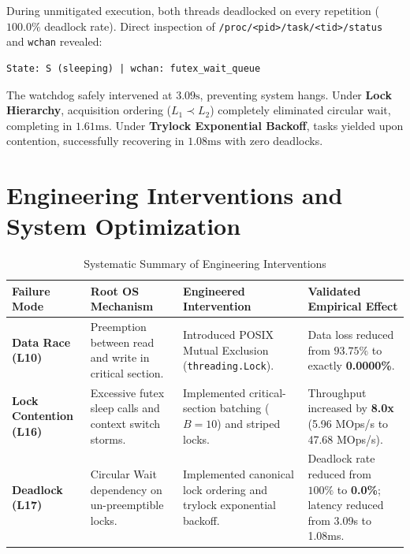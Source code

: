 \documentclass[11pt,a4paper]{article}
\begin{document}
During unmitigated execution, both threads deadlocked on every repetition ($100.0\%$ deadlock rate). Direct inspection of \texttt{/proc/<pid>/task/<tid>/status} and \texttt{wchan} revealed:
\begin{verbatim}
State: S (sleeping) | wchan: futex_wait_queue
\end{verbatim}
The watchdog safely intervened at $3.09\text{s}$, preventing system hangs. Under \textbf{Lock Hierarchy}, acquisition ordering ($L_1 \prec L_2$) completely eliminated circular wait, completing in $1.61\text{ms}$. Under \textbf{Trylock Exponential Backoff}, tasks yielded upon contention, successfully recovering in $1.08\text{ms}$ with zero deadlocks.

\section{Engineering Interventions and System Optimization}

\begin{table}[H]
\centering
\caption{Systematic Summary of Engineering Interventions}
\label{tab:interventions}
\begin{tabularx}{\textwidth}{lXXp{4.2cm}}
\toprule
\textbf{Failure Mode} & \textbf{Root OS Mechanism} & \textbf{Engineered Intervention} & \textbf{Validated Empirical Effect} \\
\midrule
\textbf{Data Race (L10)} & Preemption between read and write in critical section. & Introduced POSIX Mutual Exclusion (\texttt{threading.Lock}). & Data loss reduced from $93.75\%$ to exactly \textbf{0.0000\%}. \\
\midrule
\textbf{Lock Contention (L16)} & Excessive futex sleep calls and context switch storms. & Implemented critical-section batching ($B=10$) and striped locks. & Throughput increased by \textbf{8.0x} (5.96 MOps/s to 47.68 MOps/s). \\
\midrule
\textbf{Deadlock (L17)} & Circular Wait dependency on un-preemptible locks. & Implemented canonical lock ordering and trylock exponential backoff. & Deadlock rate reduced from $100\%$ to \textbf{0.0\%}; latency reduced from 3.09s to 1.08ms. \\
\bottomrule
\end{tabularx}
\end{table}

\end{document}
